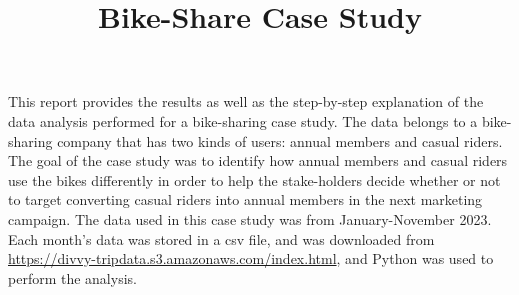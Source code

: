 \documentclass[12pt]{article}
\begin{document}
\title{Bike-Share Case Study}
\date{}
\maketitle

This report provides the results as well as the step-by-step explanation of the data analysis performed for a bike-sharing case study. The data belongs to a bike-sharing company that has two kinds of users: annual members and casual riders. The goal of the case study was to identify how annual members and casual riders use the bikes differently in order to help the stake-holders decide whether or not to target converting casual riders into annual members in the next marketing campaign. The data used in this case study was from January-November 2023. Each month's data was stored in a csv file, and was downloaded from \url{https://divvy-tripdata.s3.amazonaws.com/index.html}, and Python was used to perform the analysis.
\end{document}
